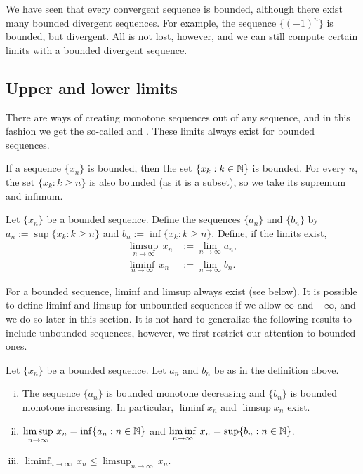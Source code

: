 We have seen that every convergent sequence is bounded,
although there exist many bounded divergent sequences.  For example,
the sequence $\{ {(-1)}^n \}$ is bounded,
but divergent.  All is not lost, however, and we can
still compute certain limits with a bounded divergent sequence.

\subsection{Upper and lower limits}

There are ways of creating monotone sequences out of any sequence, and
in this fashion we
get the so-called \emph{} and
\emph{}.  These limits always exist for bounded
sequences.

If a sequence $\{ x_n \}$ is bounded, then 
the set $\{ x_k : k \in {\mathbb{N}} \}$ is bounded.  For every $n$,
the set $\{ x_k : k \geq n \}$ is also bounded (as it is a subset), so we
take its supremum and infimum.

\begin{defn} \label{liminflimsup:def}
Let $\{ x_n \}$ be a bounded sequence.  Define the sequences $\{ a_n \}$
and $\{ b_n \}$ by
$a_n := \sup \{ x_k : k \geq n \}$ and
$b_n := \inf \{ x_k : k \geq n \}$.  
Define, if the limits exist,
\begin{align*}
\limsup_{n \to \infty} \, x_n & := \lim_{n \to \infty} a_n ,
\\
\liminf_{n \to \infty} \, x_n & := \lim_{n \to \infty} b_n .
\end{align*}
\end{defn}

For a bounded sequence, liminf and limsup always exist (see below).  It is possible
to define liminf and limsup for unbounded sequences if we allow $\infty$
and $-\infty$, and we do so later in this section.
It is not hard to generalize the following results to
include unbounded sequences, however, we first restrict our attention to
bounded ones.

\begin{prop}
Let $\{ x_n \}$ be a bounded sequence.  Let $a_n$ and $b_n$ be as in
the definition above.
\begin{enumerate}[(i)]
\item
The
sequence $\{ a_n \}$ is bounded monotone decreasing
and $\{ b_n \}$ is bounded monotone increasing.  In particular,
$\liminf x_n$ and $\limsup x_n$ exist.
\item
$\displaystyle \limsup_{n \to \infty} \, x_n = \inf \{ a_n : n \in {\mathbb{N}} \}$
and
$\displaystyle \liminf_{n \to \infty} \, x_n = \sup \{ b_n : n \in {\mathbb{N}} \}$.
\item
$\displaystyle \liminf_{n \to \infty} \, x_n \leq
\limsup_{n \to \infty} \, x_n$.
\end{enumerate}
\end{prop}

